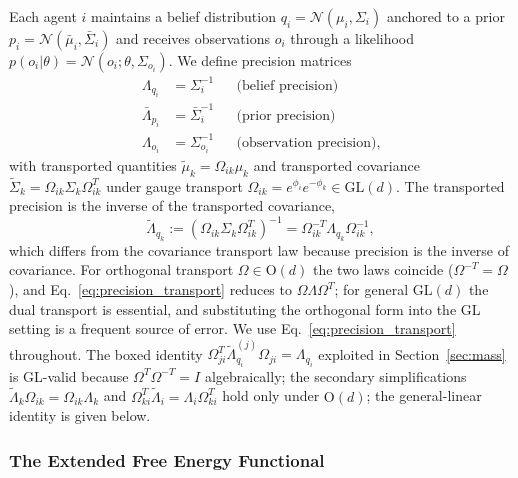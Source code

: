 \documentclass[11pt]{article}
\begin{document}
Each agent $i$ maintains a belief distribution $q_i = \mathcal{N}(\mu_i, \Sigma_i)$ anchored to a prior $p_i = \mathcal{N}(\bar{\mu}_i, \bar{\Sigma}_i)$ and receives observations $o_i$ through a likelihood $p(o_i | \theta) = \mathcal{N}(o_i; \theta, \Sigma_{o_i})$. We define precision matrices
\begin{align}
\Lambda_{q_i} &= \Sigma_i^{-1} & &\text{(belief precision)} \\
\bar{\Lambda}_{p_i} &= \bar{\Sigma}_i^{-1} & &\text{(prior precision)} \\
\Lambda_{o_i} &= \Sigma_{o_i}^{-1} & &\text{(observation precision)},
\end{align}
with transported quantities $\tilde{\mu}_k = \Omega_{ik}\mu_k$ and transported covariance $\tilde{\Sigma}_k = \Omega_{ik}\Sigma_k\Omega_{ik}^T$ under gauge transport $\Omega_{ik} = e^{\phi_i}e^{-\phi_k} \in \mathrm{GL}(d)$. The transported precision is the inverse of the transported covariance,
\begin{equation}
\tilde{\Lambda}_{q_k} := (\Omega_{ik}\Sigma_k\Omega_{ik}^T)^{-1} = \Omega_{ik}^{-T}\Lambda_{q_k}\Omega_{ik}^{-1},
\label{eq:precision_transport}
\end{equation}
which differs from the covariance transport law because precision is the inverse of covariance. For orthogonal transport $\Omega \in \mathrm{O}(d)$ the two laws coincide ($\Omega^{-T} = \Omega$), and Eq.~\eqref{eq:precision_transport} reduces to $\Omega\Lambda\Omega^T$; for general $\mathrm{GL}(d)$ the dual transport is essential, and substituting the orthogonal form into the GL setting is a frequent source of error. We use Eq.~\eqref{eq:precision_transport} throughout. The boxed identity $\Omega_{ji}^T \tilde{\Lambda}_{q_i}^{(j)} \Omega_{ji} = \Lambda_{q_i}$ exploited in Section~\ref{sec:mass} is GL-valid because $\Omega^T \Omega^{-T} = I$ algebraically; the secondary simplifications $\tilde{\Lambda}_k\Omega_{ik} = \Omega_{ik}\Lambda_k$ and $\Omega_{ki}^T\tilde\Lambda_i = \Lambda_i\Omega_{ki}^T$ hold only under $\mathrm{O}(d)$; the general-linear identity is given below.

\subsubsection{The Extended Free Energy Functional}
\end{document}
